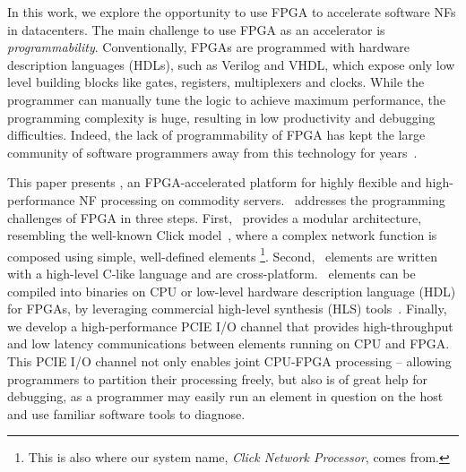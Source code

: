 In this work, we explore the opportunity to use FPGA to accelerate software NFs in datacenters.
The main challenge to use FPGA as an accelerator is \textit{programmability}. 
Conventionally, FPGAs are programmed with hardware description 
languages (HDLs), such as Verilog and VHDL, which expose only low
level building blocks like gates, registers, multiplexers and clocks. 
While the programmer can manually tune the logic to achieve maximum performance,
the programming complexity is huge, resulting in low productivity and debugging
difficulties.
%
Indeed, the lack of programmability of FPGA has kept the large community 
of software programmers away from this technology for years~\cite{bacon2013fpga}. 

This paper presents \name, an FPGA-accelerated platform for 
highly flexible and high-performance NF processing 
on commodity servers. 
%
\name\ addresses the programming challenges of FPGA in three steps.
First, \name\ provides a modular architecture, resembling the well-known 
Click model~\cite{kohler2000click}, where a complex network function is 
composed using simple, well-defined elements
\footnote{This is also where our system name, \textit{Click Network Processor}, comes from.}.  
Second, \name\ elements are written with a high-level C-like language
 and are cross-platform. 
\name\ elements can be compiled into binaries on CPU or 
low-level hardware description language (HDL) for FPGAs, by
leveraging commercial high-level synthesis (HLS) tools~\cite{vivado, aoc, sdaccel}. 
%
Finally, we develop a high-performance PCIE I/O channel that provides 
high-throughput and low latency communications between elements running on CPU 
and FPGA.
This PCIE I/O channel not only enables joint CPU-FPGA processing -- allowing programmers to 
partition their processing freely, but also is of great help for debugging, 
as a programmer may easily run an element in question on the host 
and use familiar software tools to diagnose. 

